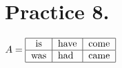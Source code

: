 \documentclass[a4paper,12pt]{article}
\begin{document}
\section*{Practice 8.}
$A=\begin{tabular}{|c|l|c|}
                              \hline
                              is & have& come\\
                              \hline
                             was & had& came \\
                              \hline
                             \end{tabular}$
%
%
%
%
%
%
%
%
%
%
\end{document}
